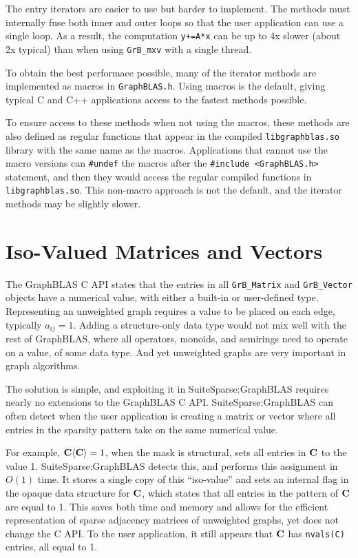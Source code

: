 \documentclass[12pt]{article}
\begin{document}
The entry iterators are easier to use but harder to implement.  The methods
must internally fuse both inner and outer loops so that the user application can
use a single loop.  As a result, the computation \verb'y+=A*x' can be up to
4x slower (about 2x typical) than when using \verb'GrB_mxv' with a single
thread.

To obtain the best performace possible, many of the iterator methods are
implemented as macros in \verb'GraphBLAS.h'.  Using macros is the default,
giving typical C and C++ applications access to the fastest methods possible.

To ensure access to these methods when not using the macros, these methods are
also defined as regular functions that appear in the compiled
\verb'libgraphblas.so' library with the same name as the macros.  Applications
that cannot use the macro versions can \verb'#undef' the macros after the
\verb'#include <GraphBLAS.h>' statement, and then they would access the regular
compiled functions in \verb'libgraphblas.so'.  This non-macro approach is not
the default, and the iterator methods may be slightly slower.

\newpage
\section{Iso-Valued Matrices and Vectors } %
\label{iso}

The GraphBLAS C API states that the entries in all \verb'GrB_Matrix' and
\verb'GrB_Vector' objects have a numerical value, with either a built-in or
user-defined type.  Representing an unweighted graph requires a value to be
placed on each edge, typically $a_{ij}=1$.  Adding a structure-only data type
would not mix well with the rest of GraphBLAS, where all operators, monoids,
and semirings need to operate on a value, of some data type.  And yet
unweighted graphs are very important in graph algorithms.

The solution is simple, and exploiting it in SuiteSparse:GraphBLAS requires
nearly no extensions to the GraphBLAS C API.   SuiteSparse:GraphBLAS can often
detect when the user application is creating a matrix or vector where all
entries in the sparsity pattern take on the same numerical value.

For example, ${\bf C \langle C \rangle} = 1$, when the mask is structural, sets
all entries in $\bf C$ to the value 1.  SuiteSparse:GraphBLAS detects this, and
performs this assignment in $O(1)$ time.  It stores a single copy of this
``iso-value'' and sets an internal flag in the opaque data structure for $\bf
C$, which states that all entries in the pattern of $\bf C$ are equal to 1.
This saves both time and memory and allows for the efficient representation of
sparse adjacency matrices of unweighted graphs, yet does not change the C API.
To the user application, it still appears that $\bf C$ has \verb'nvals(C)'
entries, all equal to 1.
\end{document}

